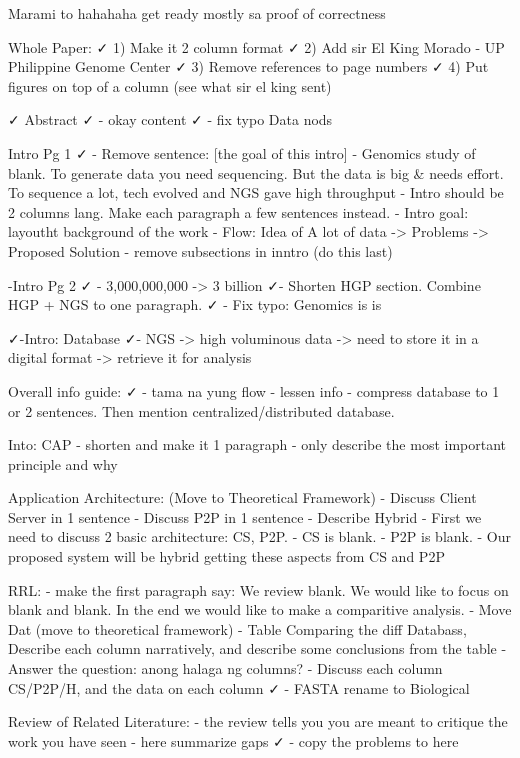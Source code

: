 Marami to hahahaha get ready mostly sa proof of correctness

Whole Paper:
✓ 1) Make it 2 column format
✓ 2) Add sir El King Morado - UP Philippine Genome Center
✓ 3) Remove references to page numbers
✓ 4) Put figures on top of a column (see what sir el king sent)

✓ Abstract
✓ - okay content
✓ - fix typo Data nods

Intro Pg 1
✓ - Remove sentence: [the goal of this intro]
- Genomics study of blank. To generate data you need sequencing. But the data is big & needs effort. To sequence a lot, tech evolved and NGS gave high throughput
- Intro should be 2 columns lang. Make each paragraph a few sentences instead.
- Intro goal: layoutht background of the work
- Flow: Idea of A lot of data -> Problems -> Proposed Solution
- remove subsections in inntro (do this last)


-Intro Pg 2
✓ - 3,000,000,000 -> 3 billion
✓- Shorten HGP section. Combine HGP + NGS to one paragraph.
✓ - Fix typo: Genomics is is

✓-Intro: Database
✓- NGS -> high voluminous data -> need to store it in a digital format -> retrieve it for analysis


Overall info guide: 
✓ - tama na yung flow
- lessen info
- compress database to 1 or 2 sentences. Then mention centralized/distributed database.

Into: CAP
- shorten and make it 1 paragraph
- only describe the most important principle and why

Application Architecture: (Move to Theoretical Framework)
- Discuss Client Server in 1 sentence
- Discuss P2P in 1 sentence
- Describe Hybrid 
- First we need to discuss 2 basic architecture: CS, P2P. 
- CS is blank. 
- P2P is blank. 
- Our proposed system will be hybrid getting these aspects from CS and P2P

RRL:
- make the first paragraph say: We review blank. We would like to focus on blank and blank. In the end we would like to make a comparitive analysis. 
- Move Dat (move to theoretical framework)
- Table Comparing the diff Databass, Describe each column narratively, and describe some conclusions from the table
- Answer the question: anong halaga ng columns? 
- Discuss each column CS/P2P/H, and the data on each column
✓ - FASTA rename to Biological

Review of Related Literature:
- the review tells you you are meant to critique the work you have seen
- here summarize gaps 
✓ - copy the problems to here


